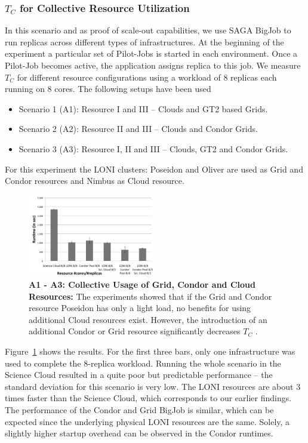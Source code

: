 \documentclass[conference,final]{IEEEtran}
\newcommand{\up}{\vspace*{-1em}}
\newcommand{\tc}{$T_{C}$ }
\begin{document}
\subsubsection{\tc for Collective Resource Utilization}

In this scenario and as proof of scale-out capabilities, we use SAGA
BigJob to run replicas across different types of infrastructures.
At the beginning of the experiment a particular set of Pilot-Jobs is
started in each environment. Once a Pilot-Job becomes active, the
application assigns replica to this job.  We measure \tc for different
resource configurations using a workload of 8 replicas each running on
8 cores. The following setups have been used
\begin{itemize}
\item Scenario 1 (A1): Resource I and III -- Clouds and GT2 based Grids. 
\item Scenario 2 (A2): Resource II and III -- Clouds and Condor Grids.
\item Scenario 3 (A3): Resource I, II and III -- Clouds, GT2 and Condor Grids.
\end{itemize} 
For this experiment the LONI clusters: Poseidon and Oliver are used as
Grid and Condor resources and Nimbus as Cloud resource.

\begin{figure}[htbp]
    \centering
        \includegraphics[width=0.49\textwidth]{performance/8replica_scenario_grid_condor_cloud}
        \caption{\textbf{A1 - A3: Collective Usage of Grid, Condor and
            Cloud Resources: } The experiments showed that if the Grid
          and Condor resource Poseidon has only a light load, no
          benefits for using additional Cloud resources
          exist. However, the introduction of an additional Condor or
          Grid resource significantly decreases \tc.\up}
    \label{fig:performance_8replica_grid_cloud_condor}
\end{figure}

Figure~\ref{fig:performance_8replica_grid_cloud_condor} shows the
results. For the first three bars, only one infrastructure was used to
complete the 8-replica workload. Running the whole scenario in the
Science Cloud resulted in a quite poor but predictable performance --
the standard deviation for this scenario is very low. The LONI
resources are about 3 times faster than the Science Cloud, which
corresponds to our earlier findings.  The performance of the Condor
and Grid BigJob is similar, which can be expected since the underlying
physical LONI resources are the same.  Solely, a slightly higher
startup overhead can be observed in the Condor runtimes.
\end{document}

